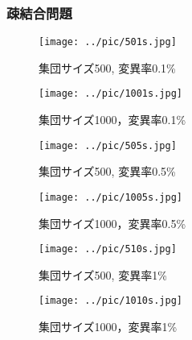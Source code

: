 \documentclass[a4j]{jarticle}
\begin{document}
\subsubsection*{疎結合問題}
\begin{figure}[H]
 \begin{minipage}{0.5\hsize}
  \begin{center}
   \texttt{[image: ../pic/501s.jpg]}
  \end{center}
  \caption{集団サイズ500, 変異率0.1\%}
  \label{501s}
 \end{minipage}
 \begin{minipage}{0.5\hsize}
  \begin{center}
   \texttt{[image: ../pic/1001s.jpg]}
  \end{center}
  \caption{集団サイズ1000，変異率0.1\%}
  \label{1001s}
 \end{minipage}
\end{figure}

\begin{figure}[H]
 \begin{minipage}{0.5\hsize}
  \begin{center}
   \texttt{[image: ../pic/505s.jpg]}
  \end{center}
  \caption{集団サイズ500, 変異率0.5\%}
  \label{505s}
 \end{minipage}
 \begin{minipage}{0.5\hsize}
  \begin{center}
   \texttt{[image: ../pic/1005s.jpg]}
  \end{center}
  \caption{集団サイズ1000，変異率0.5\%}
  \label{1005s}
 \end{minipage}
\end{figure}

\begin{figure}[H]
 \begin{minipage}{0.5\hsize}
  \begin{center}
   \texttt{[image: ../pic/510s.jpg]}
  \end{center}
  \caption{集団サイズ500, 変異率1\%}
  \label{510s}
 \end{minipage}
 \begin{minipage}{0.5\hsize}
  \begin{center}
   \texttt{[image: ../pic/1010s.jpg]}
  \end{center}
  \caption{集団サイズ1000，変異率1\%}
  \label{1010s}
 \end{minipage}
\end{figure}
\end{document}
